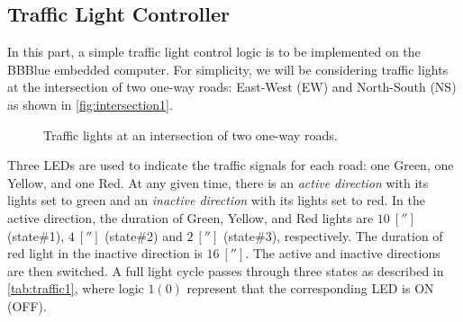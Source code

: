 \subsection{Traffic Light Controller}
\label{sec:voltageDivider}
In this part, a simple traffic light control logic is to be implemented on the BBBlue embedded computer. For simplicity, we will be considering traffic lights at the intersection
of two one-way roads: East-West (EW) and North-South (NS) as shown in
\autoref{fig:intersection1}. %
%
\begin{figure}
  \centering
  \caption{Traffic lights at an intersection of two one-way roads.}
  \label{fig:intersection1}
\end{figure}
%
Three LEDs are used to indicate the traffic signals
for each road: one Green, one Yellow, and one Red. At any given time, there is
an \emph{active direction} with its lights set to green and an \emph{inactive
  direction} with its lights set to red. In the active direction, the duration
of Green, Yellow, and Red lights are $10~[\second]$ (state\#1), $4~[\second]$
(state\#2) and $2~[\second]$ (state\#3), respectively. The duration of red light
in the inactive direction is $16~[\second].$ The active and inactive directions
are then switched. A full light cycle passes through three states as described
in \autoref{tab:traffic1}, where logic $1(0)$ represent that the corresponding
LED is ON (OFF). %
